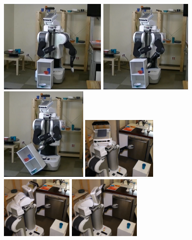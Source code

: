 \begin{figure}[t]
  \centering
  \includegraphics[height=1.8in]{figs/8/fail1.png}
  \includegraphics[height=1.8in]{figs/8/fail2.png}
  \includegraphics[height=1.8in]{figs/8/fail3.png}
  \includegraphics[height=1.2in]{figs/8/succ1.png}
  \includegraphics[height=1.2in]{figs/8/succ2.png}
  \includegraphics[height=1.2in]{figs/8/succ3.png}

\end{figure}
